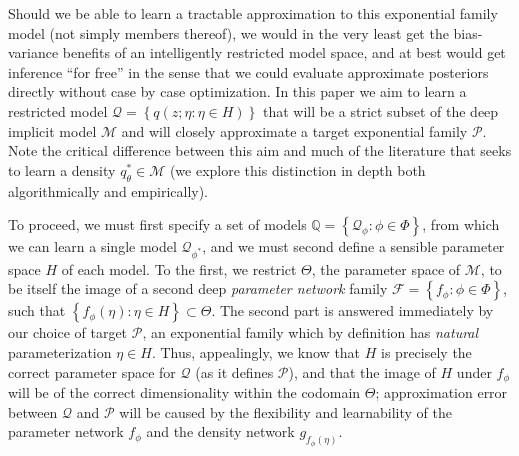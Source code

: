 \documentclass{article}
\begin{document}
 Should we be able to learn a tractable approximation to this exponential family model (not simply members thereof), we would in the very least get the bias-variance benefits of an intelligently restricted model space, and at best would get inference ``for free'' in the sense that we could evaluate approximate posteriors directly without case by case optimization.  
 In this paper we aim to learn a restricted model $\mathcal{Q} = \left\{ q(z; \eta: \eta \in H)\right\}$ that will be a strict subset of the deep implicit model $\mathcal{M}$ and will closely approximate a target exponential family $\mathcal{P}$.  
 Note the critical difference between this aim and much of the literature that seeks to learn a density $q_{\theta}^* \in \mathcal{M}$ (we explore this distinction in depth both algorithmically and empirically).  
 
To proceed, we must first specify a set of models $\mathbb{Q} = \left\{ \mathcal{Q}_\phi : \phi \in \Phi \right\}$, from which we can learn a single model $\mathcal{Q}_{\phi^*}$, and we must second define a sensible parameter space $H$ of each model.  
To the first, we restrict $\Theta$, the parameter space of $\mathcal{M}$, to be itself the image of a second deep \emph{parameter network} family $\mathcal{F} = \left\{f_\phi : \phi \in \Phi\right\}$, such that $\left\{ f_\phi(\eta) : \eta \in H \right\} \subset \Theta$.
The second part is answered immediately by our choice of target $\mathcal{P}$, an exponential family which by definition has \emph{natural} parameterization $\eta \in H$.  
Thus, appealingly, we know that $H$ is precisely the correct parameter space for $\mathcal{Q}$ (as it defines $\mathcal{P}$), and that the image of $H$ under $f_\phi$ will be of the correct dimensionality within the codomain $\Theta$; approximation error between $\mathcal{Q}$ and $\mathcal{P}$ will be caused by the flexibility and learnability of the parameter network $f_\phi$ and the density network $g_{f_{\phi}(\eta)}$.  
\end{document}
